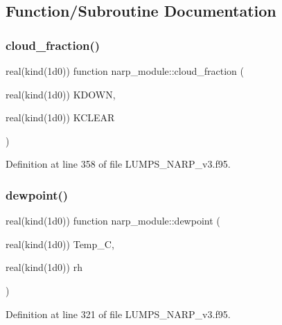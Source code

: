 \subsection{Function/\+Subroutine Documentation}
\mbox{\label{namespacenarp__module_a94b9c5403af8719752cf8b8f995cd207}} 
\subsubsection{\texorpdfstring{cloud\+\_\+fraction()}{cloud\_fraction()}}
{\footnotesize\ttfamily real(kind(1d0)) function narp\+\_\+module\+::cloud\+\_\+fraction (\begin{DoxyParamCaption}\item[{real(kind(1d0))}]{K\+D\+O\+WN,  }\item[{real(kind(1d0))}]{K\+C\+L\+E\+AR }\end{DoxyParamCaption})}



Definition at line 358 of file L\+U\+M\+P\+S\+\_\+\+N\+A\+R\+P\+\_\+v3.\+f95.

\mbox{\label{namespacenarp__module_a29289ed438f8c8f40bb9cafd90c8f87c}} 
\subsubsection{\texorpdfstring{dewpoint()}{dewpoint()}}
{\footnotesize\ttfamily real(kind(1d0)) function narp\+\_\+module\+::dewpoint (\begin{DoxyParamCaption}\item[{real(kind(1d0))}]{Temp\+\_\+C,  }\item[{real(kind(1d0))}]{rh }\end{DoxyParamCaption})}



Definition at line 321 of file L\+U\+M\+P\+S\+\_\+\+N\+A\+R\+P\+\_\+v3.\+f95.

\mbox{\label{namespacenarp__module_aa7b0905bdc9e31e2a01ef14da0f281d5}} 
